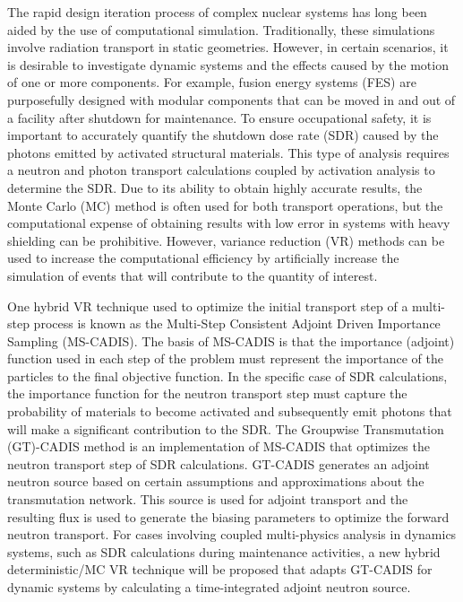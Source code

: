 
\vcinfo{}

The rapid design iteration process of complex nuclear systems has long been
aided by the use of computational simulation.  Traditionally, these simulations
involve radiation transport in static geometries.  However, in certain
scenarios, it is desirable to investigate dynamic systems and the effects caused
by the motion of one or more components.  
For example, fusion energy systems (FES) are purposefully designed with modular components that can be moved in and
out of a facility after shutdown for maintenance. 
To ensure occupational safety, it is important to accurately quantify the
shutdown dose rate (SDR) caused by the photons emitted by activated structural materials.
This type of analysis requires a neutron and photon transport calculations coupled by activation analysis to determine the SDR.
Due to its ability to obtain highly accurate results, the Monte Carlo (MC) method is often used for both transport operations, but the computational expense of obtaining results with low
error 
in systems with heavy shielding can be prohibitive.  
However, variance reduction (VR)
methods can be used to increase the computational efficiency by artificially increase the simulation of
events that will contribute to the quantity of interest.

One hybrid VR technique used to optimize the initial transport step of a
multi-step process is known as 
the Multi-Step Consistent Adjoint Driven Importance Sampling
(MS-CADIS). 
 The basis of MS-CADIS is that the importance (adjoint) function used
in each step of the problem must represent the importance of the particles to
the final objective function.  
In the specific case of SDR calculations, the importance function for the neutron transport step
must capture the probability of materials to become activated and subsequently emit photons that
will make a significant contribution to the SDR.
The Groupwise Transmutation (GT)-CADIS method 
is an implementation of MS-CADIS
that optimizes the neutron transport step of SDR calculations.
GT-CADIS generates an adjoint
neutron source based on certain assumptions and approximations about the
transmutation network.  
This source is used for adjoint transport and the resulting flux is used to
generate the biasing parameters to optimize the forward neutron transport.
For cases involving coupled multi-physics analysis in dynamics systems, such as SDR calculations
during maintenance activities,
a new hybrid deterministic/MC VR technique will be proposed that adapts 
GT-CADIS for dynamic systems by calculating a time-integrated adjoint
neutron source.


